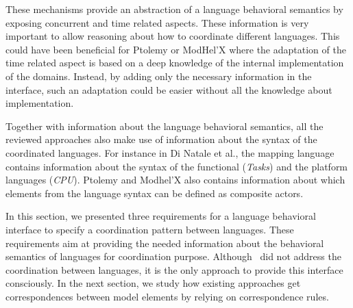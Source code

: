 These mechanisms provide an abstraction of a language behavioral semantics by exposing concurrent and time related aspects. These information is very important to allow reasoning about how to coordinate different languages. This could have been beneficial for Ptolemy or ModHel'X where the adaptation of the time related aspect is based on a deep knowledge of the internal implementation of the domains. Instead, by adding only the necessary information in the interface, such an adaptation could be easier without all the knowledge about implementation. 

Together with information about the language behavioral semantics, all the reviewed approaches also make use of information about the syntax of the coordinated languages. For instance in Di Natale et al., the mapping language contains information about the syntax of the functional (\eg \emph{Tasks}) and the platform languages (\eg \emph{CPU}). Ptolemy and Modhel'X also contains information about which elements from the language syntax can be defined as composite actors.


In this section, we presented three requirements for a language behavioral interface to specify a coordination pattern between languages. These requirements aim at providing the needed information about the behavioral semantics of languages for coordination purpose. Although~\cite{sle13-combemale} did not address the coordination between languages, it is the only approach to provide this interface consciously. In the next section, we study how existing approaches get correspondences between model elements by relying on correspondence rules.

	    	
	    	
	    				
